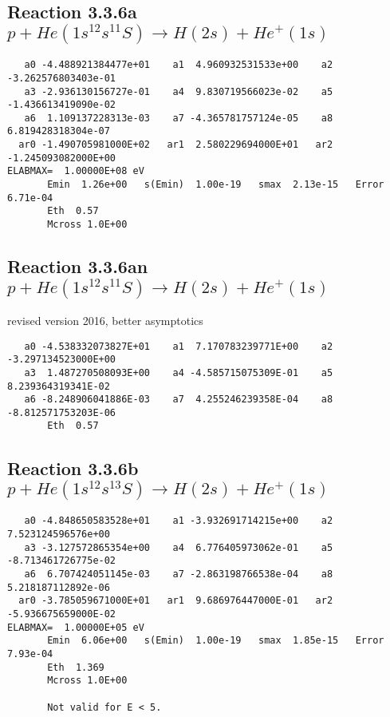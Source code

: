 \documentclass[12pt,dvipdfmx]{article}
\begin{document}
\newpage
\subsection{
Reaction 3.3.6a $   p + He(1s^12s^11S) \rightarrow H(2s) + He^+(1s)$}


\begin{small}\begin{verbatim}
   a0 -4.488921384477e+01    a1  4.960932531533e+00    a2 -3.262576803403e-01
   a3 -2.936130156727e-01    a4  9.830719566023e-02    a5 -1.436613419090e-02
   a6  1.109137228313e-03    a7 -4.365781757124e-05    a8  6.819428318304e-07
  ar0 -1.490705981000E+02   ar1  2.580229694000E+01   ar2 -1.245093082000E+00
ELABMAX=  1.00000E+08 eV
       Emin  1.26e+00   s(Emin)  1.00e-19   smax  2.13e-15   Error  6.71e-04
       Eth  0.57
       Mcross 1.0E+00
\end{verbatim}\end{small}


\subsection{
Reaction 3.3.6an $   p + He(1s^12s^11S) \rightarrow H(2s) + He^+(1s)$}
revised version 2016, better asymptotics

\begin{small}\begin{verbatim}
   a0 -4.538332073827E+01    a1  7.170783239771E+00    a2 -3.297134523000E+00
   a3  1.487270508093E+00    a4 -4.585715075309E-01    a5  8.239364319341E-02
   a6 -8.248906041886E-03    a7  4.255246239358E-04    a8 -8.812571753203E-06
       Eth  0.57
\end{verbatim}\end{small}




\newpage
\subsection{
Reaction 3.3.6b $   p + He(1s^12s^13S) \rightarrow H(2s) + He^+(1s)$}


\begin{small}\begin{verbatim}
   a0 -4.848650583528e+01    a1 -3.932691714215e+00    a2  7.523124596576e+00
   a3 -3.127572865354e+00    a4  6.776405973062e-01    a5 -8.713461726775e-02
   a6  6.707424051145e-03    a7 -2.863198766538e-04    a8  5.218187112892e-06
  ar0 -3.785059671000E+01   ar1  9.686976447000E-01   ar2 -5.936675659000E-02
ELABMAX=  1.00000E+05 eV
       Emin  6.06e+00   s(Emin)  1.00e-19   smax  1.85e-15   Error  7.93e-04
       Eth  1.369
       Mcross 1.0E+00

       Not valid for E < 5.
\end{verbatim}\end{small}
\end{document}
